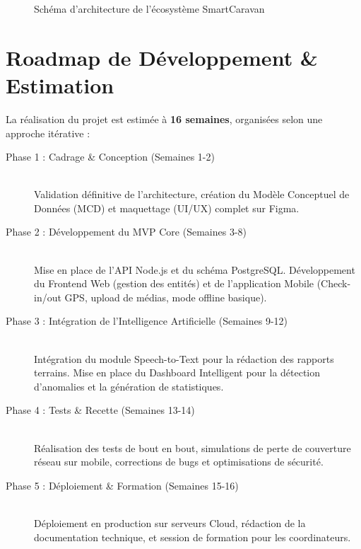 \documentclass[12pt,a4paper]{article}
\begin{document}
\begin{figure}[h]
{
    }
    \vspace{0.5cm}
    \caption{Schéma d'architecture de l'écosystème SmartCaravan}
    \label{fig:architecture}
\end{figure}

\section{Roadmap de Développement \& Estimation}
La réalisation du projet est estimée à \textbf{16 semaines}, organisées selon une approche itérative :

\begin{description}
    \item[Phase 1 : Cadrage \& Conception (Semaines 1-2)] \hfill \\
    Validation définitive de l'architecture, création du Modèle Conceptuel de Données (MCD) et maquettage (UI/UX) complet sur Figma.
    
    \item[Phase 2 : Développement du MVP Core (Semaines 3-8)] \hfill \\
    Mise en place de l'API Node.js et du schéma PostgreSQL. Développement du Frontend Web (gestion des entités) et de l'application Mobile (Check-in/out GPS, upload de médias, mode offline basique).
    
    \item[Phase 3 : Intégration de l'Intelligence Artificielle (Semaines 9-12)] \hfill \\
    Intégration du module Speech-to-Text pour la rédaction des rapports terrains. Mise en place du Dashboard Intelligent pour la détection d'anomalies et la génération de statistiques.
    
    \item[Phase 4 : Tests \& Recette (Semaines 13-14)] \hfill \\
    Réalisation des tests de bout en bout, simulations de perte de couverture réseau sur mobile, corrections de bugs et optimisations de sécurité.
    
    \item[Phase 5 : Déploiement \& Formation (Semaines 15-16)] \hfill \\
    Déploiement en production sur serveurs Cloud, rédaction de la documentation technique, et session de formation pour les coordinateurs.
\end{description}
\end{document}
